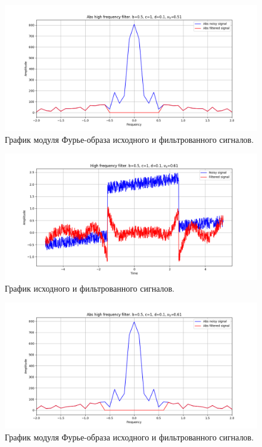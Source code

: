 \documentclass[a4paper, 12pt]{article}
\begin{document}
    \begin{figure}[!htb]
        \centering
        \includegraphics[scale=0.485]{5_abs_u_U_nolow.png}
        \captionsetup{skip=0pt}
        \caption{График модуля Фурье-образа исходного и фильтрованного сигналов.}
        \label{fig:fig36}
    \end{figure}
    \begin{figure}[!htb]
        \centering
        \includegraphics[scale=0.485]{6_u_flt_u_nolow.png}
        \captionsetup{skip=0pt}
        \caption{График исходного и фильтрованного сигналов.}
        \label{fig:fig37}
    \end{figure}
    \begin{figure}[!htb]
        \centering
        \includegraphics[scale=0.485]{6_abs_u_U_nolow.png}
        \captionsetup{skip=0pt}
        \caption{График модуля Фурье-образа исходного и фильтрованного сигналов.}
        \label{fig:fig38}
    \end{figure}
\end{document}
